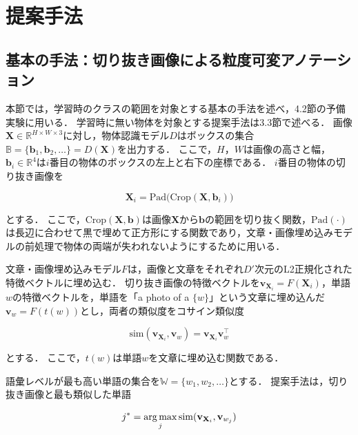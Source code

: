 \section{提案手法}
\subsection{基本の手法：切り抜き画像による粒度可変アノテーション}
本節では，学習時のクラスの範囲を対象とする基本の手法を述べ，4.2節の予備実験に用いる．
学習時に無い物体を対象とする提案手法は3.3節で述べる．
画像$ {\mathbf X} \in {\mathbb R}^{H \times W \times 3} $に対し，物体認識モデル$ D $はボックスの集合$ {\mathbb B} = \{ {\mathbf b}_1, {\mathbf b}_2, \ldots \} = D({\mathbf X}) $を出力する．
ここで，$ H $，$ W $は画像の高さと幅，$ {\mathbf b}_i \in {\mathbb R}^4 $は$ i $番目の物体のボックスの左上と右下の座標である．
$ i $番目の物体の切り抜き画像を

\begin{equation}
    {\mathbf X}_i = \mathrm{Pad} \bigl( \mathrm{Crop}({\mathbf X}, {\mathbf b}_i) \bigr)
    \label{eq_crop}
\end{equation}

\noindent
とする．
ここで，$ \mathrm{Crop}({\mathbf X}, {\mathbf b}) $は画像$ {\mathbf X} $から$ {\mathbf b} $の範囲を切り抜く関数，$ \mathrm{Pad}(\cdot) $は長辺に合わせて黒で埋めて正方形にする関数であり，文章・画像埋め込みモデルの前処理で物体の両端が失われないようにするために用いる．

文章・画像埋め込みモデル$ F $は，画像と文章をそれぞれ$ D' $次元のL2正規化された特徴ベクトルに埋め込む．
切り抜き画像の特徴ベクトルを$ {\mathbf v}_{{\mathbf X}_i} = F({\mathbf X}_i) $，単語$ w $の特徴ベクトルを，単語を「a photo of a $ \{w\} $」という文章に埋め込んだ$ {\mathbf v}_w = F(t(w)) $とし，両者の類似度をコサイン類似度

\begin{equation}
    \mathrm{sim}({\mathbf v}_{{\mathbf X}_i}, {\mathbf v}_w) = {\mathbf v}_{{\mathbf X}_i} {\mathbf v}_w^{\top}
    \label{eq_similarity}
\end{equation}

\noindent
とする．
ここで，$ t(w) $は単語$ w $を文章に埋め込む関数である．

語彙レベルが最も高い単語の集合を$ {\mathbb W} = \{ w_1, w_2, \ldots \} $とする．
提案手法は，切り抜き画像と最も類似した単語

\begin{equation}
    j^\ast = \operatorname*{arg\,max}_{j} \mathrm{sim}({\mathbf v}_{{\mathbf X}_i}, {\mathbf v}_{w_j})
    \label{eq_argmax}
\end{equation}

